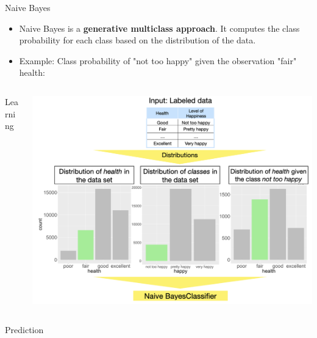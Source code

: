 \documentclass[11pt,compress,t,notes=noshow, xcolor=table]{beamer}
\begin{document}

\begin{vbframe}{Naive Bayes}
\begin{itemize}
\item \small Naive Bayes is a \textbf{generative multiclass approach}. It computes the class probability for each class based on the distribution of the data.
\item \small Example: Class probability of "not too happy" given the observation "fair" health:
\end{itemize}

\begin{columns}
\begin{column}{0.1\textwidth}
\begin{center}
Learning
\end{center}
\end{column}
\begin{column}{0.7\textwidth} 

  \includegraphics[width=1\textwidth]{slides/supervised-classification/figure_man/nutshell-classification-naive-bayes-learning.png}
\end{column}
\end{columns}

\newpage

\begin{columns}
\begin{column}{0.08\textwidth}
\begin{center}
Prediction
\end{center}
\end{column}
\begin{column}{0.75\textwidth} 


\end{column}
\end{columns}
\end{vbframe}
\end{document}
